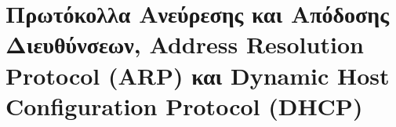 %
%
\section{Πρωτόκολλα Ανεύρεσης και Απόδοσης Διευθύνσεων, Address Resolution Protocol (ARP) και Dynamic Host Configuration Protocol (DHCP)}
